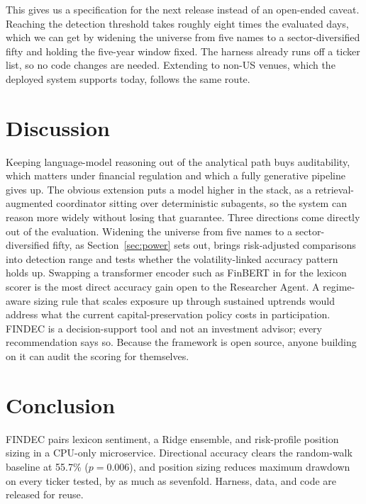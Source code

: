 \documentclass[conference]{IEEEtran}
\begin{document}
This gives us a specification for the next release instead of an open-ended caveat. Reaching the detection threshold takes roughly eight times the evaluated days, which we can get by widening the universe from five names to a sector-diversified fifty and holding the five-year window fixed. The harness already runs off a ticker list, so no code changes are needed. Extending to non-US venues, which the deployed system supports today, follows the same route.

\section{Discussion}
\label{sec:discussion}

Keeping language-model reasoning out of the analytical path buys auditability, which matters under financial regulation and which a fully generative pipeline gives up. The obvious extension puts a model higher in the stack, as a retrieval-augmented coordinator sitting over deterministic subagents, so the system can reason more widely without losing that guarantee. Three directions come directly out of the evaluation. Widening the universe from five names to a sector-diversified fifty, as Section~\ref{sec:power} sets out, brings risk-adjusted comparisons into detection range and tests whether the volatility-linked accuracy pattern holds up. Swapping a transformer encoder such as FinBERT in for the lexicon scorer is the most direct accuracy gain open to the Researcher Agent. A regime-aware sizing rule that scales exposure up through sustained uptrends would address what the current capital-preservation policy costs in participation. FINDEC is a decision-support tool and not an investment advisor; every recommendation says so. Because the framework is open source, anyone building on it can audit the scoring for themselves.

\section{Conclusion}
\label{sec:conclusion}

FINDEC pairs lexicon sentiment, a Ridge ensemble, and risk-profile position sizing in a CPU-only microservice. Directional accuracy clears the random-walk baseline at 55.7\% ($p=0.006$), and position sizing reduces maximum drawdown on every ticker tested, by as much as sevenfold. Harness, data, and code are released for reuse.



\end{document}
